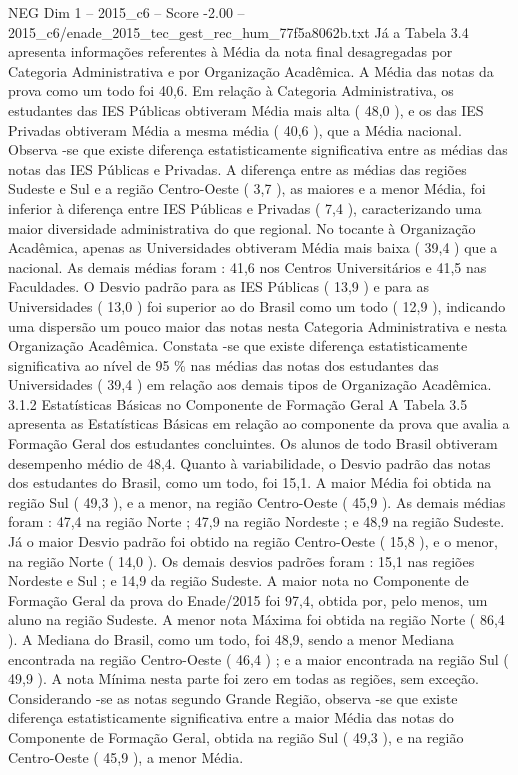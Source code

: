 \begin{textsample}{NEG Dim 1 – 2015\_c6 – Score -2.00 – 2015\_c6/enade\_2015\_tec\_gest\_rec\_hum\_77f5a8062b.txt}
Já a Tabela 3.4 apresenta informações referentes à Média da nota final desagregadas por Categoria Administrativa e por Organização Acadêmica.
A Média das notas da prova como um todo foi 40,6.
Em relação à Categoria Administrativa, os estudantes das IES Públicas obtiveram Média mais alta ( 48,0 ), e os das IES Privadas obtiveram Média a mesma média ( 40,6 ), que a Média nacional.
Observa -se que existe diferença estatisticamente significativa entre as médias das notas das IES Públicas e Privadas.
A diferença entre as médias das regiões Sudeste e Sul e a região Centro-Oeste ( 3,7 ), as maiores e a menor Média, foi inferior à diferença entre IES Públicas e Privadas ( 7,4 ), caracterizando uma maior diversidade administrativa do que regional.
No tocante à Organização Acadêmica, apenas as Universidades obtiveram Média mais baixa ( 39,4 ) que a nacional.
As demais médias foram : 41,6 nos Centros Universitários e 41,5 nas Faculdades.
O Desvio padrão para as IES Públicas ( 13,9 ) e para as Universidades ( 13,0 ) foi superior ao do Brasil como um todo ( 12,9 ), indicando uma dispersão um pouco maior das notas nesta Categoria Administrativa e nesta Organização Acadêmica.
Constata -se que existe diferença estatisticamente significativa ao nível de 95 \% nas médias das notas dos estudantes das Universidades ( 39,4 ) em relação aos demais tipos de Organização Acadêmica. 3.1.2 Estatísticas Básicas no Componente de Formação Geral A Tabela 3.5 apresenta as Estatísticas Básicas em relação ao componente da prova que avalia a Formação Geral dos estudantes concluintes.
Os alunos de todo Brasil obtiveram desempenho médio de 48,4.
Quanto à variabilidade, o Desvio padrão das notas dos estudantes do Brasil, como um todo, foi 15,1.
A maior Média foi obtida na região Sul ( 49,3 ), e a menor, na região Centro-Oeste ( 45,9 ).
As demais médias foram : 47,4 na região Norte ; 47,9 na região Nordeste ; e 48,9 na região Sudeste.
Já o maior Desvio padrão foi obtido na região Centro-Oeste ( 15,8 ), e o menor, na região Norte ( 14,0 ).
Os demais desvios padrões foram : 15,1 nas regiões Nordeste e Sul ; e 14,9 da região Sudeste.
A maior nota no Componente de Formação Geral da prova do Enade/2015 foi 97,4, obtida por, pelo menos, um aluno na região Sudeste.
A menor nota Máxima foi obtida na região Norte ( 86,4 ).
A Mediana do Brasil, como um todo, foi 48,9, sendo a menor Mediana encontrada na região Centro-Oeste ( 46,4 ) ; e a maior encontrada na região Sul ( 49,9 ).
A nota Mínima nesta parte foi zero em todas as regiões, sem exceção.
Considerando -se as notas segundo Grande Região, observa -se que existe diferença estatisticamente significativa entre a maior Média das notas do Componente de Formação Geral, obtida na região Sul ( 49,3 ), e na região Centro-Oeste ( 45,9 ), a menor Média.

\end{textsample}
